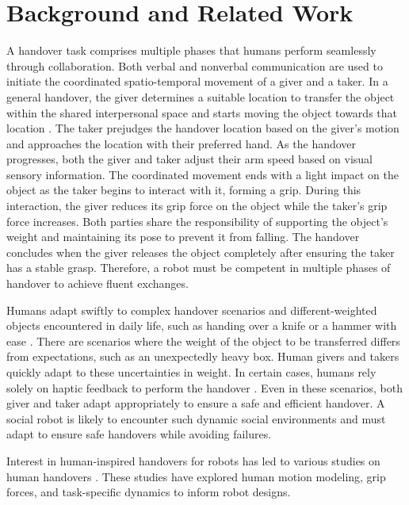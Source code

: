 \section{Background and Related Work}
A handover task comprises multiple phases that humans perform seamlessly through collaboration. Both verbal and nonverbal communication are used to initiate the coordinated spatio-temporal movement of a giver and a taker. In a general handover, the giver determines a suitable location to transfer the object within the shared interpersonal space and starts moving the object towards that location \cite{human_human_to_human_robot_study_Controzzi} \cite{survey_review_2022_object_handovers}. The taker prejudges the handover location based on the giver's motion and approaches the location with their preferred hand. As the handover progresses, both the giver and taker adjust their arm speed based on visual sensory information. The coordinated movement ends with a light impact on the object as the taker begins to interact with it, forming a grip. During this interaction, the giver reduces its grip force on the object while the taker's grip force increases. Both parties share the responsibility of supporting the object's weight and maintaining its pose to prevent it from falling. The handover concludes when the giver releases the object completely after ensuring the taker has a stable grasp. Therefore, a robot must be competent in multiple phases of handover to achieve fluent exchanges.

Humans adapt swiftly to complex handover scenarios and different-weighted objects encountered in daily life, such as handing over a knife or a hammer with ease \cite{survey_review_2022_object_handovers, When_where_how_human-human_studyStrabala, object_orientation_dataset_chan}. There are scenarios where the weight of the object to be transferred differs from expectations, such as an unexpectedly heavy box. Human givers and takers quickly adapt to these uncertainties in weight. In certain cases, humans rely solely on haptic feedback to perform the handover \cite{dataset-khanna}. Even in these scenarios, both giver and taker adapt appropriately to ensure a safe and efficient handover. A social robot is likely to encounter such dynamic social environments and must adapt to ensure safe handovers while avoiding failures.

Interest in human-inspired handovers for robots has led to various studies on human handovers \cite{survey_review_2022_object_handovers}. These studies have explored human motion modeling, grip forces, and task-specific dynamics to inform robot designs.
